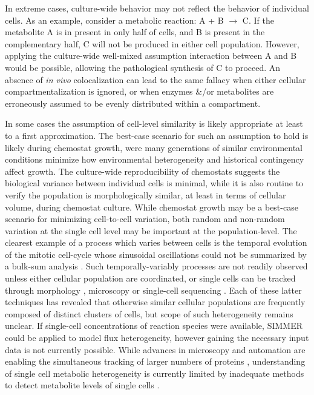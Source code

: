 In extreme cases, culture-wide behavior may not reflect the behavior of individual cells. As an example, consider a metabolic reaction: A + B $\rightarrow$ C. If the metabolite A is in present in only half of cells, and B is present in the complementary half, C will not be produced in either cell population. However, applying the culture-wide well-mixed assumption interaction between A and B would be possible, allowing the pathological synthesis of C to proceed. An absence of \textit{in vivo} colocalization can lead to the same fallacy when either cellular compartmentalization is ignored, or when enzymes \&/or metabolites are erroneously assumed to be evenly distributed within a compartment.

In some cases the assumption of cell-level similarity is likely appropriate at least to a first approximation. The best-case scenario for such an assumption to hold is likely during chemostat growth, were many generations of similar environmental conditions minimize how environmental heterogeneity and historical contingency affect growth. The culture-wide reproducibility of chemostats suggests the biological variance between individual cells is minimal, while it is also routine to verify the population is morphologically similar, at least in terms of cellular volume, during chemostat culture. While chemostat growth may be a best-case scenario for minimizing cell-to-cell variation, both random \cite{BarEven:2006dz, Kaern:2005gr} and non-random variation at the single cell level may be important at the population-level. The clearest example of a process which varies between cells is the temporal evolution of the mitotic cell-cycle whose sinusoidal oscillations could not be summarized by a bulk-sum analysis \cite{Hartwell:1974uy, Spellman:1998wj}. Such temporally-variably processes are not readily observed unless either cellular population are coordinated\cite{Hartwell:1974uy, Tu:2006cl}, or single cells can be tracked through morphology \cite{Herskowitz:1988ut}, microscopy \cite{Venturelli:2015ec} or single-cell sequencing \cite{Patel:2014dt}. Each of these latter techniques has revealed that otherwise similar cellular populations are frequently composed of distinct clusters of cells, but scope of such heterogeneity remains unclear. If single-cell concentrations of reaction species were available, SIMMER could be applied to model flux heterogeneity, however gaining the necessary input data is not currently possible. While advances in microscopy and automation are enabling the simultaneous tracking of larger numbers of proteins \cite{Ghaemmaghami:2003ds, Dubuis:2013cw}, understanding of single cell metabolic heterogeneity is currently limited by inadequate methods to detect metabolite levels of single cells \cite{Zenobi:2013il}.

